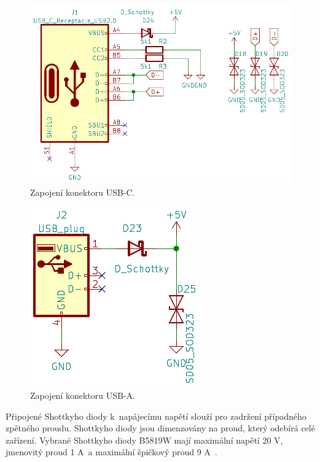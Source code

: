 \begin{figure}[!h]
  \begin{center}
    \includegraphics[scale=0.6]{obrazky/USB_C.png}
  \end{center}
  \caption[Zapojení konektoru USB-C]{Zapojení konektoru USB-C.}
\end{figure}

\begin{figure}[!h]
  \begin{center}
    \includegraphics[scale=0.7]{obrazky/USB_A.png}
  \end{center}
  \caption[Zapojení konektoru USB-A]{Zapojení konektoru USB-A.}
\end{figure}

Připojené Shottkyho diody k~napájecímu napětí slouží pro zadržení případného zpětného proudu. Shottkyho diody jsou dimenzovány na proud, který odebírá celé zařízení. Vybrané 
Shottkyho diody  B5819W mají maximální napětí 20 V, jmenovitý proud 1 A~a maximální špičkový proud 9 A~\cite{shotky_dtsh}.

